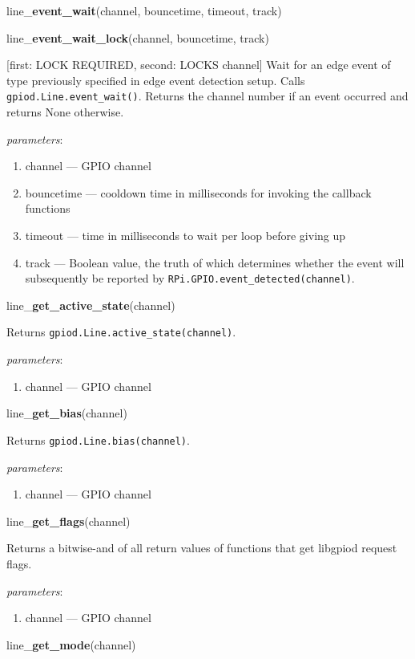 \documentclass[12pt]{article}
\begin{document}
\noindent line\_\textbf{event\_wait}(channel, bouncetime, timeout, track)

\noindent line\_\textbf{event\_wait\_lock}(channel, bouncetime, track)

[first: LOCK REQUIRED, second: LOCKS channel]
Wait for an edge event of type previously specified in edge event detection setup. Calls \texttt{gpiod.Line.event\_wait()}. Returns the channel number if an event occurred and returns None otherwise. 

\textit{parameters}:
\begin{enumerate}      
        \item channel --- GPIO channel
        \item bouncetime --- cooldown time in milliseconds for invoking the callback functions
        \item timeout --- time in milliseconds to wait per loop before giving up
        \item track --- Boolean value, the truth of which determines whether the event will subsequently be reported by \texttt{RPi.GPIO.event\_detected(channel)}.
\end{enumerate}

\noindent line\_\textbf{get\_active\_state}(channel)

Returns \texttt{gpiod.Line.active\_state(channel)}.

\textit{parameters}:
\begin{enumerate}      
        \item channel --- GPIO channel
\end{enumerate}

\noindent line\_\textbf{get\_bias}(channel)

Returns \texttt{gpiod.Line.bias(channel)}.

\textit{parameters}:
\begin{enumerate}      
        \item channel --- GPIO channel
\end{enumerate}

\noindent line\_\textbf{get\_flags}(channel)

Returns a bitwise-and of all return values of functions that get libgpiod request flags.

\textit{parameters}:
\begin{enumerate}      
        \item channel --- GPIO channel
\end{enumerate}

\noindent line\_\textbf{get\_mode}(channel)
\end{document}
